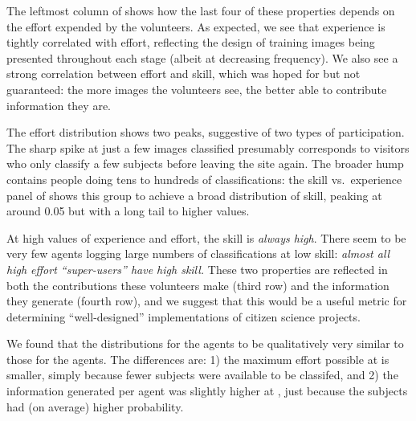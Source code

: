 \documentclass[useAMS,usenatbib,a4paper]{mn2e}
\begin{document}
The leftmost column of  shows how the last four of
these properties depends on the effort expended by the volunteers. As expected,
we see that experience is tightly correlated with effort, reflecting the design
of training images being presented throughout each stage (albeit at decreasing
frequency). We also see a strong correlation between effort and skill, which was
hoped for but not guaranteed: the more images the volunteers see, the better
able to contribute information they are.

The effort distribution shows two peaks, suggestive of two types of
participation.  The sharp spike at just a few images classified presumably
corresponds to visitors who only classify a few subjects before leaving the site
again. The broader hump contains people doing tens to hundreds of
classifications: the skill vs.\ experience panel of 
shows this group to achieve a broad distribution of  skill, peaking at around
0.05 but with a long tail to higher values.

At high values of experience and effort, the skill is \emph{always high}. There
seem to be very few agents logging large numbers of classifications at low
skill: {\it almost all high effort
``super-users'' have high skill.} These two properties are reflected in both the
contributions these volunteers make (third row) and the information they
generate (fourth row), and we suggest that this would be a useful metric for
determining ``well-designed'' implementations of citizen science projects.

We found that the distributions for the \StageTwo agents to be qualitatively
very similar to those for the \StageOne agents. The differences are: 1) the
maximum effort possible at \StageTwo is smaller, simply because fewer subjects
were available to be classifed, and 2) the information generated per agent was
slightly higher at \StageTwo, just because the subjects had (on average) higher
probability.
\end{document}
